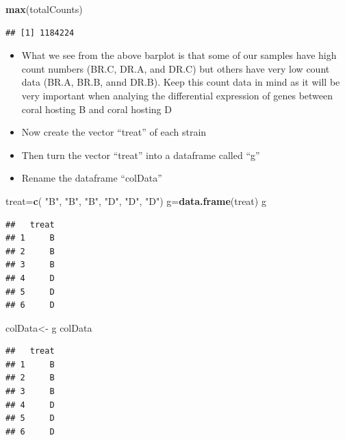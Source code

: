\documentclass[
]{article}
\newenvironment{Shaded}{\begin{snugshade}}{\end{snugshade}}
\newcommand{\KeywordTok}[1]{\textcolor[rgb]{0.13,0.29,0.53}{\textbf{#1}}}
\newcommand{\NormalTok}[1]{#1}
\newcommand{\StringTok}[1]{\textcolor[rgb]{0.31,0.60,0.02}{#1}}
\begin{document}
\begin{Shaded}
\begin{Highlighting}[]
\KeywordTok{max}\NormalTok{(totalCounts)}
\end{Highlighting}
\end{Shaded}

\begin{verbatim}
## [1] 1184224
\end{verbatim}

\begin{itemize}
\item
  What we see from the above barplot is that some of our samples have
  high count numbers (BR.C, DR.A, and DR.C) but others have very low
  count data (BR.A, BR.B, annd DR.B). Keep this count data in mind as it
  will be very important when analying the differential expression of
  genes between coral hosting B and coral hosting D
\item
  Now create the vector ``treat'' of each strain
\item
  Then turn the vector ``treat'' into a dataframe called ``g''
\item
  Rename the dataframe ``colData''
\end{itemize}

\begin{Shaded}
\begin{Highlighting}[]
\NormalTok{treat=}\KeywordTok{c}\NormalTok{( }\StringTok{"B"}\NormalTok{, }\StringTok{"B"}\NormalTok{, }\StringTok{"B"}\NormalTok{, }\StringTok{"D"}\NormalTok{, }\StringTok{"D"}\NormalTok{, }\StringTok{"D"}\NormalTok{)}
\NormalTok{g=}\KeywordTok{data.frame}\NormalTok{(treat)}
\NormalTok{g}
\end{Highlighting}
\end{Shaded}

\begin{verbatim}
##   treat
## 1     B
## 2     B
## 3     B
## 4     D
## 5     D
## 6     D
\end{verbatim}

\begin{Shaded}
\begin{Highlighting}[]
\NormalTok{colData<-}\StringTok{ }\NormalTok{g}
\NormalTok{colData}
\end{Highlighting}
\end{Shaded}

\begin{verbatim}
##   treat
## 1     B
## 2     B
## 3     B
## 4     D
## 5     D
## 6     D
\end{verbatim}
\end{document}
